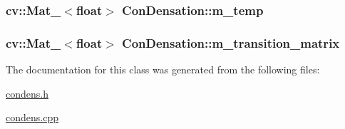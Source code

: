 \hypertarget{classConDensation_a3908e7f2187a4b0010fadff24b950130}{
\subsubsection[{m\-\_\-temp}]{\setlength{\rightskip}{0pt plus 5cm}cv\-::\-Mat\-\_\-$<$float$>$ Con\-Densation\-::m\-\_\-temp\hspace{0.3cm}{\ttfamily [protected]}}}\label{classConDensation_a3908e7f2187a4b0010fadff24b950130}
\hypertarget{classConDensation_a4aef4dc8a1246b56ca4996cddb4ddebf}{
\subsubsection[{m\-\_\-transition\-\_\-matrix}]{\setlength{\rightskip}{0pt plus 5cm}cv\-::\-Mat\-\_\-$<$float$>$ Con\-Densation\-::m\-\_\-transition\-\_\-matrix\hspace{0.3cm}{\ttfamily [protected]}}}\label{classConDensation_a4aef4dc8a1246b56ca4996cddb4ddebf}


The documentation for this class was generated from the following files\-:\begin{DoxyCompactItemize}
\item 
\hyperlink{condens_8h}{condens.\-h}\item 
\hyperlink{condens_8cpp}{condens.\-cpp}\end{DoxyCompactItemize}
